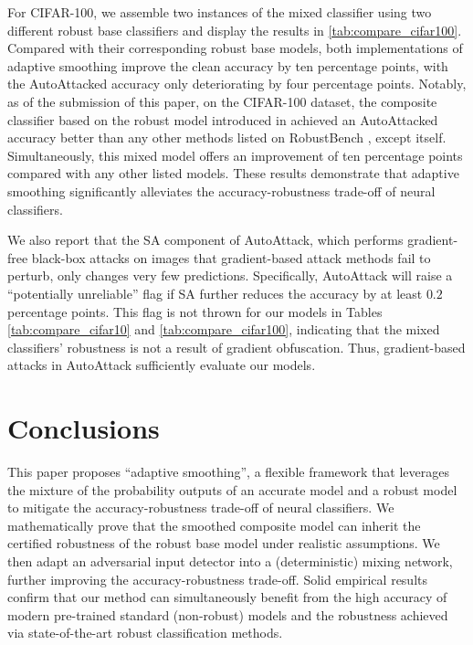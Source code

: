 \documentclass[11pt, letterpaper]{article}
\theoremstyle{plain}
\theoremstyle{definition}
\begin{document}
For CIFAR-100, we assemble two instances of the mixed classifier using two different robust base classifiers and display the results in \cref{tab:compare_cifar100}. Compared with their corresponding robust base models, both implementations of adaptive smoothing improve the clean accuracy by ten percentage points, with the AutoAttacked accuracy only deteriorating by four percentage points. Notably, as of the submission of this paper, on the CIFAR-100 dataset, the composite classifier based on the robust model introduced in \citep{Wang23} achieved an AutoAttacked accuracy better than any other methods listed on RobustBench \citep{Croce20c}, except \citep{Wang23} itself. Simultaneously, this mixed model offers an improvement of ten percentage points compared with any other listed models. These results demonstrate that adaptive smoothing significantly alleviates the accuracy-robustness trade-off of neural classifiers.

We also report that the SA component of AutoAttack, which performs gradient-free black-box attacks on images that gradient-based attack methods fail to perturb, only changes very few predictions. Specifically, AutoAttack will raise a ``potentially unreliable'' flag if SA further reduces the accuracy by at least $0.2$ percentage points. This flag is not thrown for our models in Tables \ref{tab:compare_cifar10} and \ref{tab:compare_cifar100}, indicating that the mixed classifiers' robustness is not a result of gradient obfuscation. Thus, gradient-based attacks in AutoAttack sufficiently evaluate our models.



\section{Conclusions}

This paper proposes ``adaptive smoothing'', a flexible framework that leverages the mixture of the probability outputs of an accurate model and a robust model to mitigate the accuracy-robustness trade-off of neural classifiers. We mathematically prove that the smoothed composite model can inherit the certified robustness of the robust base model under realistic assumptions. We then adapt an adversarial input detector into a (deterministic) mixing network, further improving the accuracy-robustness trade-off. Solid empirical results confirm that our method can simultaneously benefit from the high accuracy of modern pre-trained standard (non-robust) models and the robustness achieved via state-of-the-art robust classification methods. 
\end{document}
